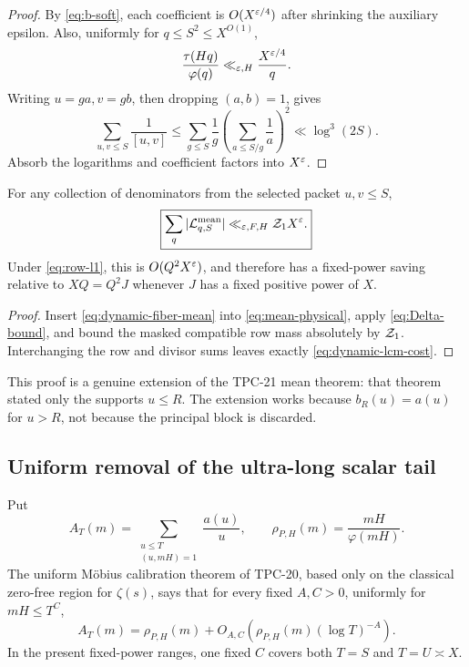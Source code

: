 \begin{proof}
By \eqref{eq:b-soft}, each coefficient is \(O(X^{\varepsilon/4})\) after
shrinking the auxiliary epsilon.  Also, uniformly for
\(q\le S^2\le X^{O(1)}\),
\[
 \frac{\tau(Hq)}{\varphi(q)}\ll_{\varepsilon,H}\frac{X^{\varepsilon/4}}q.
\]
Writing \(u=ga,v=gb\), then dropping \((a,b)=1\), gives
\begin{equation}
 \sum_{u,v\le S}\frac1{[u,v]}
 \le\sum_{g\le S}\frac1g
 \left(\sum_{a\le S/g}\frac1a\right)^2
 \ll\log^3(2S).
 \label{eq:reciprocal-lcm}
\end{equation}
Absorb the logarithms and coefficient factors into \(X^\varepsilon\).
\end{proof}

\begin{theorem}
\label{thm:dynamic-mean}
For any collection of denominators from the selected packet
\(u,v\le S\),
\begin{equation}
 \boxed{
 \sum_q|\mathcal L_{q,S}^{\rm mean}|
 \ll_{\varepsilon,F,H}\mathcal Z_1X^\varepsilon.}
 \label{eq:dynamic-mean-bound}
\end{equation}
Under \eqref{eq:row-l1}, this is \(O(Q^2X^\varepsilon)\), and therefore has
a fixed-power saving relative to \(XQ=Q^2J\) whenever \(J\) has a
fixed positive power of \(X\).
\end{theorem}

\begin{proof}
Insert \eqref{eq:dynamic-fiber-mean} into
\eqref{eq:mean-physical}, apply \eqref{eq:Delta-bound}, and bound the
masked compatible row mass absolutely by \(\mathcal Z_1\).  Interchanging the
row and divisor sums leaves exactly \eqref{eq:dynamic-lcm-cost}.
\end{proof}

This proof is a genuine extension of the TPC-21 mean theorem: that
theorem stated only the supports \(u\le R\).  The extension works
because \(b_R(u)=a(u)\) for \(u>R\), not because the principal block is
discarded.

\subsection{Uniform removal of the ultra-long scalar tail}

Put
\begin{equation}
 A_T(m)=\sum_{\substack{u\le T\\(u,mH)=1}}\frac{a(u)}u,
 \qquad \rho_{P,H}(m)=\frac{mH}{\varphi(mH)}.
 \label{eq:AT}
\end{equation}
The uniform M\"obius calibration theorem of TPC-20, based only on the
classical zero-free region for \(\zeta(s)\), says that for every fixed
\(A,C>0\), uniformly for \(mH\le T^C\),
\begin{equation}
 A_T(m)=\rho_{P,H}(m)
 +O_{A,C}\left(\rho_{P,H}(m)(\log T)^{-A}\right).
 \label{eq:uniform-calibration}
\end{equation}
In the present fixed-power ranges, one fixed \(C\) covers both
\(T=S\) and \(T=U\asymp X\).

